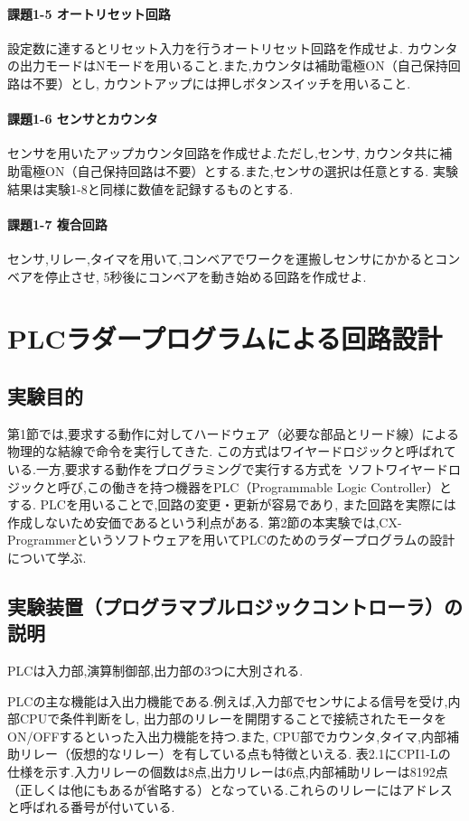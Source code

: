 \paragraph{課題1-5 オートリセット回路}
設定数に達するとリセット入力を行うオートリセット回路を作成せよ.
カウンタの出力モードはNモードを用いること.また,カウンタは補助電極ON（自己保持回路は不要）とし,
カウントアップには押しボタンスイッチを用いること.

\paragraph{課題1-6 センサとカウンタ}
センサを用いたアップカウンタ回路を作成せよ.ただし,センサ,
カウンタ共に補助電極ON（自己保持回路は不要）とする.また,センサの選択は任意とする.
実験結果は実験1-8と同様に数値を記録するものとする.

\paragraph{課題1-7 複合回路}
センサ,リレー,タイマを用いて,コンベアでワークを運搬しセンサにかかるとコンベアを停止させ,
5秒後にコンベアを動き始める回路を作成せよ.


\section{PLCラダープログラムによる回路設計}

\subsection{実験目的}
第1節では,要求する動作に対してハードウェア（必要な部品とリード線）による物理的な結線で命令を実行してきた.
この方式はワイヤードロジックと呼ばれている.一方,要求する動作をプログラミングで実行する方式を
ソフトワイヤードロジックと呼び,この働きを持つ機器をPLC（Programmable Logic Controller）とする.
PLCを用いることで,回路の変更・更新が容易であり,
また回路を実際には作成しないため安価であるという利点がある.
第2節の本実験では,CX-Programmerというソフトウェアを用いてPLCのためのラダープログラムの設計について学ぶ.


\subsection{実験装置（プログラマブルロジックコントローラ）の説明}
PLCは入力部,演算制御部,出力部の3つに大別される.

PLCの主な機能は入出力機能である.例えば,入力部でセンサによる信号を受け,内部CPUで条件判断をし,
出力部のリレーを開閉することで接続されたモータをON/OFFするといった入出力機能を持つ.また,
CPU部でカウンタ,タイマ,内部補助リレー（仮想的なリレー）を有している点も特徴といえる.
表2.1にCPI1-Lの仕様を示す.入力リレーの個数は8点,出力リレーは6点,内部補助リレーは8192点
（正しくは他にもあるが省略する）となっている.これらのリレーにはアドレスと呼ばれる番号が付いている.

